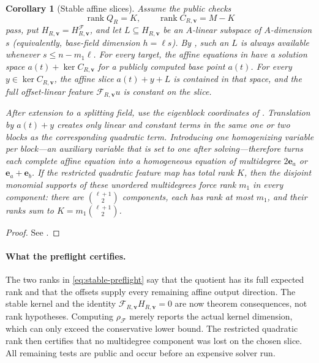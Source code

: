 \documentclass[11pt]{article}
\newtheorem{corollary}[corollary]{Corollary}
\newcommand{\rank}{\operatorname{rank}}
\begin{document}
\begin{corollary}[Stable affine slices]\label{cor:stable-slices}
Assume the public checks
\begin{equation}\label{eq:stable-preflight}
 \rank Q_R=K,\qquad
 \rank C_{R,\mathbf v}=M-K
\end{equation}
pass, put $H_{R,\mathbf v}=H^{\mathcal F}_{R,\mathbf v}$, and let
$L\subseteq H_{R,\mathbf v}$ be an $A$-linear subspace of $A$-dimension $s$
(equivalently, base-field dimension $h=\ell s$).  By
, such an $L$ is always available whenever
$s\le n-m_1\ell$.  For every
target, the affine equations in  have a
solution space $a(t)+\ker C_{R,\mathbf v}$ for a publicly computed base point
$a(t)$.  For every $y\in\ker C_{R,\mathbf v}$, the affine
slice $a(t)+y+L$ is contained in that space, and the full offset-linear feature
$\mathcal F_{R,\mathbf v}u$ is constant on the slice.

After extension to a splitting field, use the eigenblock coordinates of
.  Translation by $a(t)+y$ creates only linear and
constant terms in the same one or two blocks as the corresponding quadratic
term.  Introducing one homogenizing variable per block---an auxiliary variable that
is set to one after solving---therefore turns each complete affine equation
into a homogeneous equation of multidegree
$2\mathbf e_a$ or $\mathbf e_a+\mathbf e_b$.  If the restricted quadratic
feature map has total rank $K$, then the disjoint monomial supports of these
unordered multidegrees force rank $m_1$ in every component: there are
$\binom{\ell+1}{2}$ components, each has rank at most $m_1$, and their ranks
sum to $K=m_1\binom{\ell+1}{2}$.
\end{corollary}

\begin{proof}
See .
\end{proof}

\paragraph{What the preflight certifies.}
The two ranks in \eqref{eq:stable-preflight} say that the quotient has its full
expected rank and that the offsets supply every remaining affine output
direction.  The stable kernel and the identity
$\mathcal F_{R,\mathbf v}H_{R,\mathbf v}=0$ are now theorem consequences, not
rank hypotheses.  Computing $\rho_{\mathcal F}$ merely reports the actual
kernel dimension, which can only exceed the conservative lower bound.  The
restricted quadratic rank then certifies that no multidegree component was
lost on the chosen slice.  All remaining tests are public and occur before an
expensive solver run.
\end{document}
